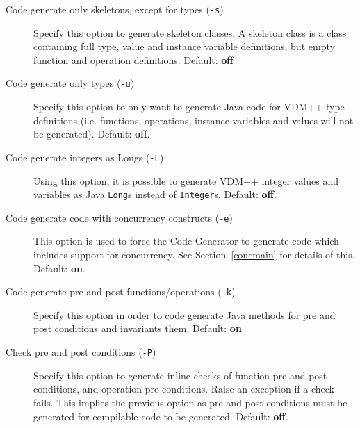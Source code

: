 \documentclass[\pformat,11pt]{article}
\begin{document}
\begin{description}
\item [Code generate only skeletons, except for types ({\tt -s})] 
  Specify this  option to
  generate skeleton classes. A skeleton class is a 
  class containing full type, value and instance variable definitions,
  but empty function and operation definitions.  Default: \textbf{off}
\item [Code generate only types ({\tt -u})] 
  Specify this
  option to only want to generate Java code for VDM++ type
  definitions (i.e. functions, operations, instance variables and
  values will not be generated). Default: \textbf{off}.%
\item [Code generate integers as Longs (\texttt{-L})]
  Using this
  option, it is possible to generate VDM++ integer values and
  variables as Java \texttt{Long}s instead of
  \texttt{Integer}s. Default: \textbf{off}.
\item [Code generate code with concurrency constructs (\texttt{-e})]
  This option is used to force the Code Generator to generate code
  which includes support for concurrency. See Section~\ref{concmain}
  for details of this. Default: \textbf{on}.
\item [Code generate pre and post functions/operations (\texttt{-k})] 
  Specify this option
  in order to code generate Java methods for pre and post conditions
  and invariants them. Default: \textbf{on}%
\item [Check pre and post conditions (\texttt{-P})] 
  Specify this option to generate inline checks of function pre and post
  conditions, and operation pre conditions. Raise an exception if a
  check fails. This implies the
  previous option as pre and post conditions must be generated for
  compilable code to be generated. Default: \textbf{off}.%

\end{description}
\end{document}
